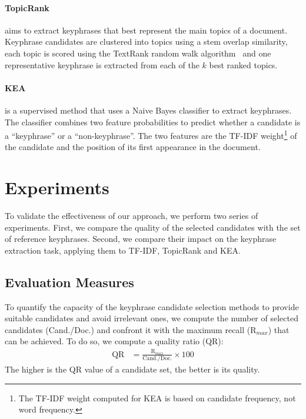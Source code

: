   \paragraph{TopicRank~\textnormal{\cite{bougouin2013topicrank}}} aims to
  extract keyphrases that best represent the main topics of a document.
  Keyphrase candidates are clustered into topics using a stem overlap
  similarity, each topic is scored using the TextRank random walk
  algorithm~\cite{mihalcea2004textrank} and one representative keyphrase is
  extracted from each of the $k$ best ranked topics.

  \paragraph{KEA~\textnormal{\cite{witten1999kea}}} is a supervised method that
  uses a Naive Bayes classifier to extract keyphrases. The classifier combines
  two feature probabilities to predict whether a candidate is a ``keyphrase'' or
  a ``non-keyphrase''. The two features are the TF-IDF weight\footnote{The
    TF-IDF weight computed for KEA is based on candidate frequency, not word
  frequency.} of the candidate and the position of its first appearance in the
  document.

\section{Experiments}
\label{sec:evaluation}
  To validate the effectiveness of our approach, we perform two series of
  experiments. First, we compare the quality of the selected candidates with the
  set of reference keyphrases. Second, we compare their impact on the keyphrase
  extraction task, applying them to TF-IDF, TopicRank and KEA.

  \subsection{Evaluation Measures}
  \label{subsec:keyphrase_extraction_evaluation_measures}
    To quantify the capacity of the keyphrase candidate selection methods to
    provide suitable candidates and avoid irrelevant ones, we compute the
    number of selected candidates (Cand./Doc.) and confront it with the
    maximum recall (R$_{max}$) that can be achieved. To do so, we compute a
    quality ratio (QR):
    \begin{align}
      \text{QR} &= \frac{\text{R$_{max}$}}{\text{Cand./Doc.}} \times 100
    \end{align}
    The higher is the QR value of a candidate set, the better is its quality.

